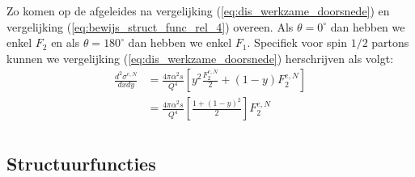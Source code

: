 \documentclass[../main.tex]{subfiles}
\begin{document}
Zo komen op de afgeleides na vergelijking (\ref{eq:dis_werkzame_doorsnede}) en vergelijking (\ref{eq:bewijs_struct_func_rel_4}) overeen. Als $\theta=0^\circ$ dan hebben we enkel $F_2$ en als $\theta=180^\circ$ dan hebben we enkel $F_1$. Specifiek voor spin $1/2$ partons kunnen we vergelijking (\ref{eq:dis_werkzame_doorsnede}) herschrijven als volgt:
\begin{equation}
    \begin{aligned}
        \label{eq:struct_func_parton}
        \frac{d^2\sigma^{e,N}}{dxdy} &= \frac{4\pi\alpha^2s}{Q^4} \left[y^2 \frac{F_2^{e,N}}{2} + (1-y)F_2^{e,N}\right]\\
                                     &= \frac{4\pi\alpha^2s}{Q^4} \left[\frac{1+(1-y)^2}{2}\right]F_2^{e,N}\\
    \end{aligned}
\end{equation}

\subsection{Structuurfuncties}%
\label{sub:structuur_functies}
\end{document}
